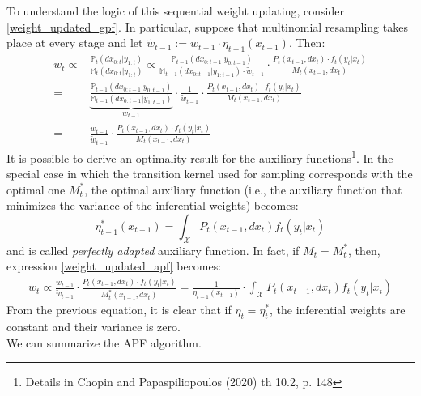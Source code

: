 \documentclass[
]{book}
\theoremstyle{break}
\theoremstyle{nonumberplain}
\begin{document}
To understand the logic of this sequential weight updating, consider
\eqref{weight_updated_gpf}. In particular, suppose that multinomial
resampling takes place at every stage and let
\(\tilde w_{t-1}:=w_{t-1}\cdot \eta_{t-1} (x_{t-1})\). Then:
\begin{equation}
    \begin{split}
        w_t\propto&\frac{\mathbb P_t(dx_{0:t}|y_{1:t})}{\mathbb M_t(dx_{0:t}|y_{1:t})}\propto \frac{\mathbb P_{t-1}(dx_{0:t-1}|y_{0:t-1})}{\mathbb M_{t-1}(dx_{0:t-1}|y_{1:t-1})\cdot \tilde w_{t-1}}\cdot\frac{P_t(x_{t-1},dx_t)\cdot f_t(y_t|x_t)}{ M_t(x_{t-1},dx_t)}\\
        =&\underbrace{\frac{\mathbb P_{t-1}(dx_{0:t-1}|y_{0:t-1})}{\mathbb M_{t-1}(dx_{0:t-1}|y_{1:t-1})}}_{w_{t-1}}\cdot\frac{1}{\tilde w_{t-1}}\cdot\frac{P_t(x_{t-1},dx_t)\cdot f_t(y_t|x_t)}{ M_t(x_{t-1},dx_t)}\\
        =&\frac{w_{t-1}}{ \tilde w_{t-1}}\cdot\frac{P_t(x_{t-1},dx_t)\cdot f_t(y_t|x_t)}{ M_t(x_{t-1},dx_t)}\label{weight_updated_apf}
    \end{split}
\end{equation} It is possible to derive an optimality result for the
auxiliary
functions\footnote{Details in Chopin and Papaspiliopoulos (2020) th 10.2, p. 148}.
In the special case in which the transition kernel used for sampling
corresponds with the optimal one \(M_t^*\), the optimal auxiliary
function (i.e., the auxiliary function that minimizes the variance of
the inferential weights) becomes: \begin{equation}
    \eta_{t-1}^*(x_{t-1})=\int_\mathcal XP_t(x_{t-1},dx_t)f_t(y_t|x_t)
\end{equation} and is called \textit{perfectly adapted} auxiliary
function. In fact, if \(M_t=M_t^*\), then, expression
\eqref{weight_updated_apf} becomes: \begin{equation*}
    \begin{split}
        w_t\propto\frac{w_{t-1}}{ \tilde w_{t-1}}\cdot\frac{P_t(x_{t-1},dx_t)\cdot f_t(y_t|x_t)}{ M_t^*(x_{t-1},dx_t)}=\frac{1}{\eta_{t-1} (x_{t-1})}\cdot\int_\mathcal XP_t(x_{t-1},dx_t)f_t(y_t|x_t)
    \end{split}
\end{equation*} From the previous equation, it is clear that if
\(\eta_t=\eta_t^*\), the inferential weights are constant and their
variance is zero.\\
We can summarize the APF algorithm.
\end{document}
